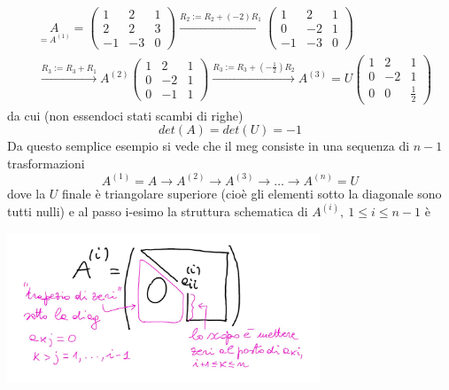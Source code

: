 \documentclass[12pt,a4paper]{article}
\begin{document}
\begin{equation*}
    \begin{split}
        & \underset{=A^{(1)}}{A}=\begin{pmatrix}
              1 & 2 & 1 \\
              2 & 2 & 3 \\
              -1 & -3 & 0
        \end{pmatrix} \overset{R_2 := R_2 + (-2) R_1}{\longrightarrow} \begin{pmatrix}
                  1 & 2 & 1 \\
                  0 & -2 & 1 \\
                 -1 & -3 & 0
        \end{pmatrix} \\
        & \overset{R_3 := R_3 + R_1}{\longrightarrow} A^{(2)} \begin{pmatrix}
                  1 & 2 & 1 \\
                  0 & -2 & 1 \\
                  0 & -1 & 1
        \end{pmatrix} \overset{R_3 := R_3 + ( -\frac{1}{2}) R_2}{\longrightarrow} A^{(3)} = U \begin{pmatrix}
                  1 & 2 & 1 \\
                  0 & -2 & 1 \\
                  0 & 0 & \frac{1}{2}
        \end{pmatrix}
    \end{split}
\end{equation*}
da cui (non essendoci stati scambi di righe)
\begin{equation*}
    det(A) = det(U) = -1
\end{equation*}
Da questo semplice esempio si vede che il meg consiste in una sequenza di $n-1$ trasformazioni
\[
A^{(1)} = A \rightarrow A^{(2)} \rightarrow A^{(3)} \rightarrow \dotso \rightarrow A^{(n)} = U
\]
dove la $U$ finale è triangolare superiore (cioè gli elementi sotto la diagonale sono tutti nulli) e al passo i-esimo la struttura schematica di $A^{(i)}, \ 1 \le i \le n-1$ è
\begin{center}
    \includegraphics[width = 0.7\textwidth]{pag16.jpg}
\end{center}
\end{document}
